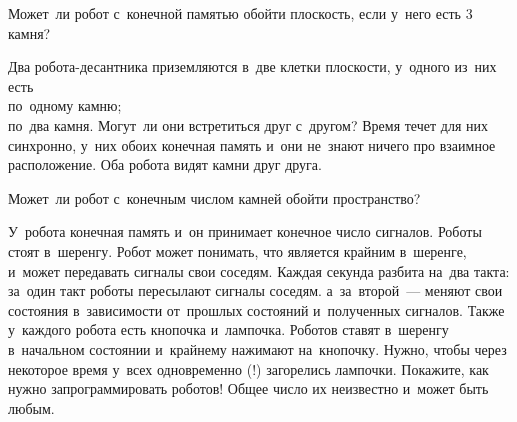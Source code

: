 \begin{problems}
\item 
Может~ли робот с~конечной памятью обойти плоскость, если у~него есть 3 камня?

\item
Два робота-десантника приземляются в~две клетки плоскости, у~одного из~них есть
\\
\subproblem по~одному камню;
\\
\subproblem по~два камня.
Могут~ли они встретиться друг с~другом?
Время течет для них синхронно, у~них обоих конечная память и~они не~знают
ничего про взаимное расположение.
Оба робота видят камни друг друга.

\item
Может~ли робот с~конечным числом камней обойти пространство?

\item
У~робота конечная память и~он принимает конечное число сигналов.
Роботы стоят в~шеренгу.
Робот может понимать, что является крайним в~шеренге, и~может передавать
сигналы свои соседям.
Каждая секунда разбита на~два такта: за~один такт роботы пересылают сигналы
соседям.
а~за~второй~--- меняют свои состояния в~зависимости от~прошлых состояний
и~полученных сигналов.
Также у~каждого робота есть кнопочка и~лампочка.
Роботов ставят в~шеренгу в~начальном состоянии и~крайнему нажимают на~кнопочку.
Нужно, чтобы через некоторое время у~всех одновременно (!) загорелись лампочки.
Покажите, как нужно запрограммировать роботов!
Общее число их неизвестно и~может быть любым.

\end{problems}

